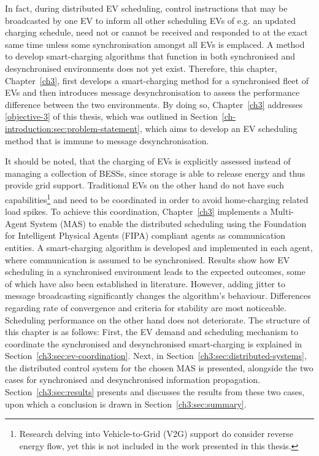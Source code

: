 In fact, during distributed EV scheduling, control instructions that may be broadcasted by one EV to inform all other scheduling EVs of e.g. an updated charging schedule, need not or cannot be received and responded to at the exact same time unless some synchronisation amongst all EVs is emplaced.
A method to develop smart-charging algorithms that function in both synchronised and desynchronised environments does not yet exist.
Therefore, this chapter, Chapter~\ref{ch3}, first develops a smart-charging method for a synchronised fleet of EVs and then introduces message desynchronisation to assess the performance difference between the two environments.
By doing so, Chapter~\ref{ch3} addresses \ref{objective-3} of this thesis, which was outlined in Section~\ref{ch-introduction:sec:problem-statement}, which aims to develop an EV scheduling method that is immune to message desynchronisation.

It should be noted, that the charging of EVs is explicitly assessed instead of managing a collection of BESSs, since storage is able to release energy and thus provide grid support.
Traditional EVs on the other hand do not have such capabilities\footnote{Research delving into Vehicle-to-Grid (V2G) support do consider reverse energy flow, yet this is not included in the work presented in this thesis.} and need to be coordinated in order to avoid home-charging related load spikes.
To achieve this coordination, Chapter~\ref{ch3} implements a Multi-Agent System (MAS) to enable the distributed scheduling using the Foundation for Intelligent Physical Agents (FIPA) compliant agents as communication entities.
A smart-charging algorithm is developed and implemented in each agent, where communication is assumed to be synchronised.
Results show how EV scheduling in a synchronised environment leads to the expected outcomes, some of which have also been established in literature.
However, adding jitter to message broadcasting significantly changes the algorithm's behaviour.
Differences regarding rate of convergence and criteria for stability are most noticeable.
Scheduling performance on the other hand does not deteriorate.
The structure of this chapter is as follows:
First, the EV demand and scheduling mechanism to coordinate the synchronised and desynchronised smart-charging is explained in Section~\ref{ch3:sec:ev-coordination}.
Next, in Section~\ref{ch3:sec:distributed-systems}, the distributed control system for the chosen MAS is presented, alongside the two cases for synchronised and desynchronised information propagation.
Section~\ref{ch3:sec:results} presents and discusses the results from these two cases, upon which a conclusion is drawn in Section~\ref{ch3:sec:summary}.

